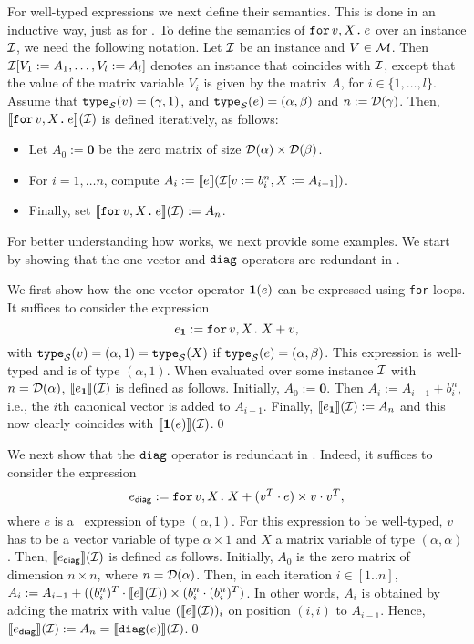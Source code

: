 For well-typed expressions we next define their semantics. This is done in an inductive way, just as for \lang. To define the semantics of $\texttt{for}\, v,X \texttt{.}\, e$ over an instance $\mathcal{I}$, we need the following notation. Let $\mathcal{I}$ be an instance and $V\in \mathcal{M}$. Then $\mathcal{I}[V_1 := A_1, \ldots, V_l:=A_l]$ denotes an instance that coincides with $\mathcal{I}$, except that the value of the matrix variable $V_i$ is given by the matrix $A$, for $i\in\lbrace 1, \ldots, l\rbrace$. Assume that
$\texttt{type}_{\mathcal{S}}(v)= (\gamma,1)$, and $\texttt{type}_{\mathcal{S}}(e) = (\alpha,\beta)$ and $n := \mathcal{D}(\gamma)$. Then, $\llbracket \texttt{for}\, v,X \texttt{.}\, e \rrbracket(\mathcal{I})$ is defined iteratively, as follows:
\begin{itemize}
\item Let $A_0 := \mathbf{0}$ be the zero matrix of size $\mathcal{D}(\alpha)\times \mathcal{D}(\beta)$.
\item For $i=1,\ldots n$, compute $A_i:= \llbracket e \rrbracket(\mathcal{I}[v := b^{n}_i, X:= A_{i-1}])$.
\item Finally, set $\llbracket \texttt{for}\, v,X \texttt{.}\, e \rrbracket(\mathcal{I}):= A_{n}$.
\end{itemize}

For better understanding how \langfor  works, we next provide some  examples.
We start by showing that the one-vector and $\texttt{diag}$ operators are redundant
in \langfor.

\begin{example}\label{ex:onevec}
We first show how the one-vector operator $\mathbf{1}(e)$ can be expressed using \texttt{for} loops.
It suffices to consider the expression
$$e_{\mathbf{1}}:=\texttt{for}\, v,X \texttt{.}\, X+v,$$
with $\texttt{type}_{\mathcal{S}}(v)=(\alpha,1)=\texttt{type}_{\mathcal{S}}(X)$ if $\texttt{type}_{\mathcal{S}}(e)=(\alpha,\beta)$. This expression is well-typed
and is of type $(\alpha,1)$. When evaluated over some instance $\mathcal{I}$ with $n=\mathcal{D}(\alpha)$, $\llbracket e_{\mathbf{1}} \rrbracket(\mathcal{I})$ is defined as follows.
Initially, $A_0:=\mathbf{0}$. Then $A_i:=A_{i-1}+b_i^n$, i.e., the $i$th canonical vector is added to $A_{i-1}$.
Finally, $\llbracket e_{\mathbf{1}} \rrbracket(\mathcal{I}):=A_n$ and this now clearly coincides with $\llbracket \mathbf{1}(e) \rrbracket(\mathcal{I})$.\qed
\end{example}

\begin{example}\label{ex:diag}
We next show that the $\texttt{diag}$ operator is redundant in \langfor.
Indeed, it suffices to consider the expression
$$e_{\mathsf{diag}}:=
\texttt{for}\, v,X \texttt{.}\, X + (v^T\cdot e) \times v\cdot v^T,$$ where $e$ is a \langfor\  expression of type $(\alpha,1)$. For this expression to be well-typed, $v$ has to be a vector variable of type $\alpha\times 1$ and $X$ a matrix variable of type $(\alpha,\alpha)$. Then, $\llbracket e_{\mathsf{diag}} \rrbracket(\mathcal{I})$ is defined as follows.
Initially, $A_0$ is the zero matrix of dimension $n\times n$, where $n=\mathcal{D}(\alpha)$. Then, in each iteration
$i\in[1..n]$, $A_{i}:=A_{i-1}+  ((b_i^n)^T\cdot\llbracket e \rrbracket(\mathcal{I}))\times (b_i^n\cdot (b_i^n)^T)$. In other words, $A_i$ is obtained by adding the matrix with value $(\llbracket e \rrbracket(\mathcal{I}))_i$ on position $(i,i)$ to $A_{i-1}$. Hence, $\llbracket e_{\mathsf{diag}} \rrbracket(\mathcal{I}):=A_n=\llbracket \texttt{diag}(e) \rrbracket(\mathcal{I})$.\qed
 \end{example}


